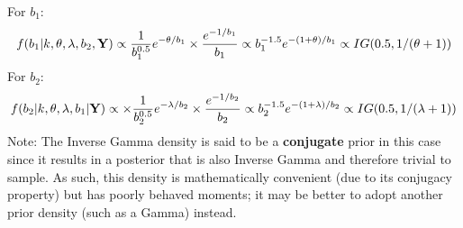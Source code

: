 \documentclass[11pt]{article}
\begin{document}
For $b_1$:
\begin{equation}
f(b_1 | k,\theta,\lambda,b_2, {\bf Y}) \propto \frac{1}{b_1^{0.5}} e^{-\theta/b_1}\times \frac{e^{-1/b_1}}{b_1}\propto b_1^{-1.5} e^{-(1+\theta)/b_1} \propto IG(0.5,1/(\theta+1))
\end{equation}
For $b_2$:
\begin{equation}
f(b_2 | k,\theta,\lambda,b_1| {\bf Y}) \propto \times \frac{1}{b_2^{0.5}} e^{-\lambda/b_2} \times \frac{e^{-1/b_2}}{b_2} \propto b_2^{-1.5} e^{-(1+\lambda)/b_2} \propto IG(0.5,1/(\lambda+1))
\end{equation}
Note: The Inverse Gamma density is said to be a {\bf conjugate} prior
in this case since it results in a posterior that is also Inverse
Gamma and therefore trivial to sample. As such, this density is
mathematically convenient (due to its conjugacy property) but has
poorly behaved moments; it may be better to adopt another prior
density (such as a Gamma) instead.
\end{document}
